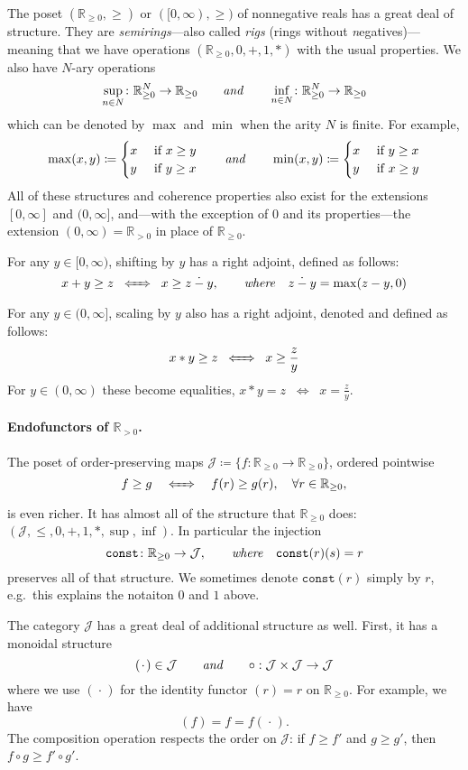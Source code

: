 \documentclass[11pt, one side, article]{memoir}
\theoremstyle{definition}
\theoremstyle{plain}
\newcommand{\cat}[1]{\mathcal{#1}}%
\newcommand{\tn}[1]{\textnormal{#1}}
\newcommand{\rr}{\mathbb{R}}
\newcommand{\const}{\texttt{const}}
\newcommand{\blank}[1][1pt]{\hspace{#1}\cdot\hspace{#1}}
\newcommand{\hh}[2][]{#1 \tn{\textit{#2}} #1}
\newcommand{\qqand}{\hh[\qquad]{and}}
\renewcommand{\iff}[1][\;\;]{#1\Leftrightarrow#1}
\newcommand{\ifff}[1][\;\;]{#1\xLeftrightarrow{\quad}#1}
\newcommand{\hi}[4][]{#1 #2 \tn{\textit{#4}} #3}
\newcommand{\where}[1][,]{\hi[#1]{\qquad}{\quad}{where}}
\newcommand{\rrpos}{\rr_{>0}}
\newcommand{\rrnon}{\rr_{\geq0}}
\newcommand{\dotminus}{\mathbin{\dot{-}}}
\newcommand{\xid}[1][\blank]{(#1)}
\begin{document}
The poset $(\rrnon,\geq)$ or $([0,\infty),\geq)$ of nonnegative reals has a great deal of structure. They are \emph{semirings}---also called \emph{rigs} (rings without \emph{n}egatives)---meaning that we have operations $(\rrnon,0,+,1,*)$ with the usual properties. We also have $N$-ary operations
\[
	\sup_{n\in N}\colon\rrnon^N\to\rrnon
	\qqand
	\inf_{n\in N}\colon\rrnon^N\to\rrnon	
\]
which can be denoted by $\max$ and $\min$ when the arity $N$ is finite. For example,
\[
\max(x,y)\coloneqq
\begin{cases}
	x&\tn{ if }x\geq y\\
	y&\tn{ if }y\geq x
\end{cases}
\qqand
\min(x,y)\coloneqq
\begin{cases}
	x&\tn{ if }y\geq x\\
	y&\tn{ if }x\geq y
\end{cases}
\]
All of these structures and coherence properties also exist for the extensions $[0,\infty]$ and $(0, \infty]$, and---with the exception of $0$ and its properties---the extension $(0,\infty)=\rrpos$ in place of $\rrnon$.

For any $y\in[0,\infty)$, shifting by $y$ has a right adjoint, defined as follows:
\[
x+y\geq z\ifff x\geq z\dotminus y
\where
z\dotminus y=\max(z-y,0)
\]
For any $y\in(0,\infty]$, scaling by $y$ also has a right adjoint, denoted and defined as follows:
\[
x*y\geq z\ifff x\geq \frac{z}{y}
\]
For $y\in(0,\infty)$ these become equalities, $x*y = z\iff x = \frac{z}{y}$.

\paragraph{Endofunctors of $\rrpos$.}

The poset of order-preserving maps $\cat{J}\coloneqq\{f\colon\rrnon\to\rrnon\}$, ordered pointwise
\[
f\geq g\ifff[\quad] f(r)\geq g(r),\quad \forall r\in\rrnon,
\]
is even richer. It has almost all of the structure that $\rrnon$ does: $(\cat{J},\leq,0,+,1,*,\sup,\inf)$. In particular the injection
\[
  \const\colon\rrnon\to\cat{J}\where\const(r)(s)=r
\]
preserves all of that structure. We sometimes denote $\const(r)$ simply by $r$, e.g.\ this explains the notaiton $0$ and $1$ above.

The category $\cat{J}$ has a great deal of additional structure as well. First, it has a monoidal structure
\[
	\xid\in\cat{J}
	\qqand
	\circ:\cat{J}\times\cat{J}\to\cat{J}
\]
where we use $\xid$ for the identity functor $\xid[r]=r$ on $\rrnon$. For example, we have
\[\xid[f]=f=f\xid.\]
The composition operation respects the order on $\cat{J}$: if $f\geq f'$ and $g\geq g'$, then $f\circ g\geq f'\circ g'$. 
\end{document}
